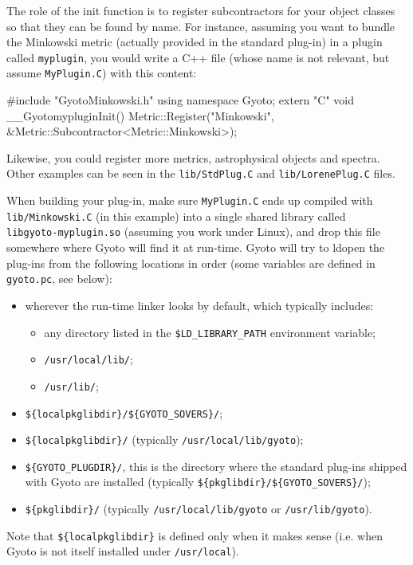 \documentclass[a4paper,12pt]{article}
\begin{document}
The role of the init function is to register subcontractors for your
object classes so that they can be found by name. For instance,
assuming you want to bundle the Minkowski metric (actually provided in
the standard plug-in) in a plugin called \texttt{myplugin}, you would
write a C++ file (whose name is not relevant, but assume
\texttt{MyPlugin.C}) with this content:

\begin{code}
#include "GyotoMinkowski.h"
using namespace Gyoto;
extern "C" void __GyotomypluginInit() {
  Metric::Register("Minkowski", \&Metric::Subcontractor<Metric::Minkowski>);
}
\end{code}

Likewise, you could register more metrics, astrophysical objects and
spectra. Other examples can be seen in the \texttt{lib/StdPlug.C} and
\texttt{lib/LorenePlug.C} files.

When building your plug-in, make sure \texttt{MyPlugin.C} ends up
compiled with\\ \texttt{lib/Minkowski.C} (in this example) into a
single shared library called\\ \texttt{libgyoto-myplugin.so} (assuming
you work under Linux), and drop this file somewhere where Gyoto
will find it at run-time. Gyoto will try to ldopen the plug-ins from
the following locations in order (some variables are defined in
\texttt{gyoto.pc}, see below):
\begin{itemize}
\item wherever the run-time linker looks by default, which typically
  includes:
  \begin{itemize}
  \item any directory listed in the \texttt{\$LD\_LIBRARY\_PATH}
    environment variable;
  \item \texttt{/usr/local/lib/};
  \item \texttt{/usr/lib/};
  \end{itemize}
\item \texttt{\$\{localpkglibdir\}/\$\{GYOTO\_SOVERS\}/};
\item \texttt{\$\{localpkglibdir\}/} (typically \texttt{/usr/local/lib/gyoto});
\item \texttt{\$\{GYOTO\_PLUGDIR\}/}, this is the directory where the
  standard plug-ins shipped with Gyoto are installed (typically
  \texttt{\$\{pkglibdir\}/\$\{GYOTO\_SOVERS\}/});
\item \texttt{\$\{pkglibdir\}/} (typically
  \texttt{/usr/local/lib/gyoto} or \texttt{/usr/lib/gyoto}).
\end{itemize}
Note that \texttt{\$\{localpkglibdir\}} is defined only when it makes
sense (i.e. when Gyoto is not itself installed under \texttt{/usr/local}).
\end{document}
